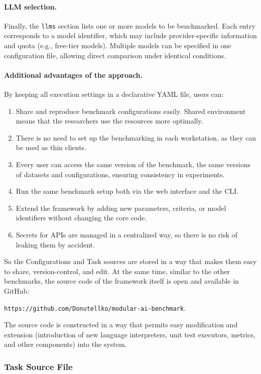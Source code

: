 \paragraph{LLM selection.}
Finally, the \texttt{llms} section lists one or more models to be benchmarked.
Each entry corresponds to a model identifier, which may include provider-specific information and quota (e.g., free-tier models).
Multiple models can be specified in one configuration file, allowing direct comparison under identical conditions.

\paragraph{Additional advantages of the approach.}
By keeping all execution settings in a declarative YAML file, users can:
\begin{enumerate}
    \item Share and reproduce benchmark configurations easily. Shared environment means that the researchers use the resources more optimally.
    \item There is no need to set up the benchmarking in each workstation, as they can be used as thin clients.
    \item Every user can access the same version of the benchmark, the same versions of datasets and configurations, ensuring consistency in experiments.
    \item Run the same benchmark setup both via the web interface and the CLI.
    \item Extend the framework by adding new parameters, criteria, or model identifiers without changing the core code.
    \item Secrets for APIs are managed in a centralized way, so there is no risk of leaking them by accident.
\end{enumerate}

So the Configurations and Task sources are stored in a way that makes them easy to share, version-control, and edit.
At the same time, similar to the other benchmarks, the source code of the framework itself is open and available in GitHub:


\texttt{https://github.com/Donutellko/modular-ai-benchmark}.


The source code is constructed in a way that permits easy modification and extension (introduction of new language interpreters, unit test executors, metrics, and other components) into the system.

\subsubsection{Task Source File}

